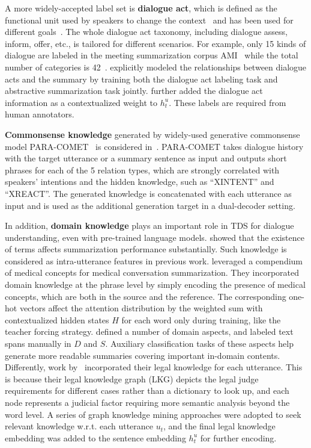 A more widely-accepted label set is \textbf{dialogue act}, which is defined as the functional unit used by speakers to change the context~\cite{bunt1994context} and has been used for different goals~\cite{kumar2018dialogue, oraby2017may}. The whole dialogue act taxonomy, including dialogue assess, inform, offer, etc., is tailored for different scenarios. For example, only 15 kinds of dialogue are labeled in the meeting summarization corpus AMI~\cite{carletta2005ami} 
while the total number of categories is 42~\cite{stolcke2000dialogue}. \citet{goo2018abstractive} explicitly modeled the relationships between dialogue acts 
and the summary by training both the dialogue act labeling task and 
abstractive summarization task jointly. 
\citet{di2020da} further added the dialogue act information as a contextualized 
weight to $h_t^u$. These labels are required from human annotators. 

\textbf{Commonsense knowledge} generated by widely-used generative commonsense model PARA-COMET~\cite{gabriel2021paragraph} is considered in~\cite{kim2022mind}. PARA-COMET takes dialogue history with the target utterance or a summary sentence as input and outputs short phrases for each of the 5 relation types, which are strongly correlated with speakers' intentions and the hidden knowledge, such as ``XINTENT'' and ``XREACT''. The generated knowledge is concatenated with each utterance as input and is used as the additional generation target in a dual-decoder setting.

In addition, \textbf{domain knowledge} plays an important role in TDS for 
dialogue understanding, even with pre-trained language models. %
\citet{koay2020meet} showed that the existence of 
terms affects summarization performance substantially. 
Such knowledge is considered as intra-utterance features in previous work.
\citet{joshi2020dr} leveraged a compendium of medical concepts for 
medical conversation summarization. They incorporated domain knowledge at 
the phrase level by simply encoding the presence of medical concepts, which 
are both in the source and the reference. The corresponding one-hot vectors 
affect the attention distribution by the weighted sum with contextualized 
hidden states $H$ for each word only during training, like the teacher forcing strategy.
\citet{gan2021inspectional} defined a number of domain aspects, and labeled text spans manually in $D$ and $S$. Auxiliary classification tasks of these aspects help generate more readable summaries covering important in-domain contents. 
Differently, work by~\citet{duan2019legal} incorporated their legal 
knowledge for each utterance. This is because their legal knowledge graph 
(LKG) depicts the legal judge requirements for different cases rather than a dictionary to look up, and each node represents a judicial factor 
requiring more semantic analysis beyond the word level. A series of graph 
knowledge mining approaches were adopted to seek relevant knowledge w.r.t. 
each utterance $u_t$, and the final legal knowledge embedding was added 
to the sentence embedding $h_t^u$ for further encoding.
 
